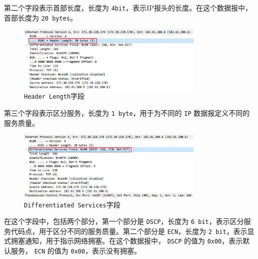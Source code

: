 \documentclass{article}
\begin{document}
第二个字段表示首部长度，长度为 \texttt{4bit}，表示IP报头的长度。在这个数据报中，首部长度为 \texttt{20 bytes}。

\begin{figure}[H]
  \centering
  \includegraphics[width=0.8\textwidth]{img/5.png}
  \caption{\texttt{Header Length}字段}
  \label{fig:6}
\end{figure}

第三个字段表示区分服务，长度为 \texttt{1 byte}，用于为不同的 \texttt{IP} 数据报定义不同的服务质量。

\begin{figure}[H]
  \centering
  \includegraphics[width=0.8\textwidth]{img/6.png}
  \caption{\texttt{Differentiated Services}字段}
  \label{fig:7}
\end{figure}

在这个字段中，包括两个部分，第一个部分是 \texttt{DSCP}，长度为 \texttt{6 bit}，表示区分服务代码点，用于区分不同的服务质量。第二个部分是 \texttt{ECN}，长度为 \texttt{2 bit}，表示显式拥塞通知，用于指示网络拥塞。在这个数据报中， \texttt{DSCP} 的值为 \texttt{0x00}，表示默认服务， \texttt{ECN} 的值为 \texttt{0x00}，表示没有拥塞。
\end{document}

